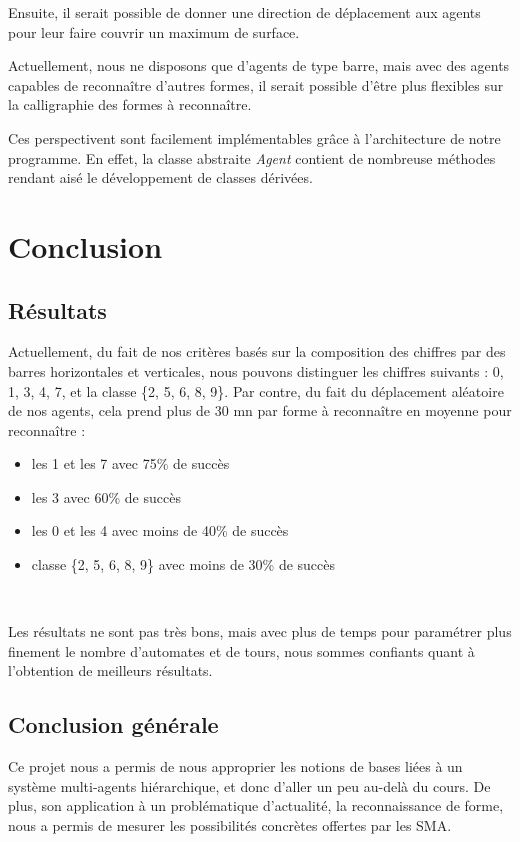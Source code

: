 \documentclass[a4paper,12pt]{report}
\begin{document}
Ensuite, il serait possible de donner une direction de déplacement aux agents pour leur faire couvrir un maximum de surface.

Actuellement, nous ne disposons que d'agents de type \og{}barre\fg{}, mais avec des agents capables de reconnaître d'autres formes, il serait possible d'être plus flexibles sur la calligraphie des formes à reconnaître.

Ces perspectivent sont facilement implémentables grâce à l'architecture de notre programme. En effet, la classe abstraite \emph{Agent} contient de nombreuse méthodes rendant aisé le développement de classes dérivées.





\chapter{Conclusion}
\section{Résultats}
Actuellement, du fait de nos critères basés sur la composition des chiffres par des barres horizontales et verticales, nous pouvons distinguer les chiffres suivants : 0, 1, 3, 4, 7, et la classe \{2, 5, 6, 8, 9\}. Par contre, du fait du déplacement aléatoire de nos agents, cela prend plus de 30 mn par forme à reconnaître en moyenne pour reconnaître :
\begin{itemize}
 \item les 1 et les 7 avec 75\% de succès
 \item les 3 avec 60\% de succès
 \item les 0 et les 4 avec moins de 40\% de succès
 \item classe \{2, 5, 6, 8, 9\} avec moins de 30\% de succès
\end{itemize}

~

Les résultats ne sont pas très bons, mais avec plus de temps pour paramétrer plus finement le nombre d'automates et de tours, nous sommes confiants quant à l'obtention de meilleurs résultats.


\section{Conclusion générale}
Ce projet nous a permis de nous approprier les notions de bases liées à un système multi-agents hiérarchique, et donc d'aller un peu au-delà du cours. De plus, son application à un problématique d'actualité, la reconnaissance de forme, nous  a permis de mesurer les possibilités concrètes offertes par les SMA.
\end{document}
